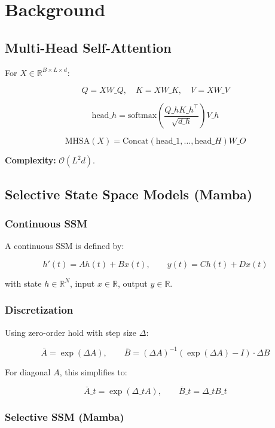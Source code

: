 
\section{Background}

\subsection{Multi-Head Self-Attention}

For $X \in \mathbb{R}^{B \times L \times d}$:

\[
Q = X W\_Q, \quad K = X W\_K, \quad V = X W\_V
\tag{3.1}
\]

\[
\text{head}\_h = \text{softmax}\!\left(\frac{Q\_h K\_h^\top}{\sqrt{d\_h}}\right) V\_h
\tag{3.2}
\]

\[
\text{MHSA}(X) = \text{Concat}(\text{head}\_1, \dots, \text{head}\_H) W\_O
\tag{3.3}
\]

\textbf{Complexity:} $\mathcal{O}(L^2 d)$.

\subsection{Selective State Space Models (Mamba)}

\subsubsection{Continuous SSM}

A continuous SSM is defined by:

\[
h'(t) = A h(t) + B x(t), \qquad
y(t) = C h(t) + D x(t)
\tag{3.4}
\]

with state $h \in \mathbb{R}^N$, input $x \in \mathbb{R}$, output $y \in \mathbb{R}$.

\subsubsection{Discretization}

Using zero-order hold with step size $\Delta$:

\[
\bar{A} = \exp(\Delta A), \qquad
\bar{B} = (\Delta A)^{-1} (\exp(\Delta A) - I) \cdot \Delta B
\tag{3.5}
\]

For diagonal $A$, this simplifies to:

\[
\bar{A}\_t = \exp(\Delta\_t A), \qquad
\bar{B}\_t = \Delta\_t B\_t
\tag{3.6}
\]

\subsubsection{Selective SSM (Mamba)}

